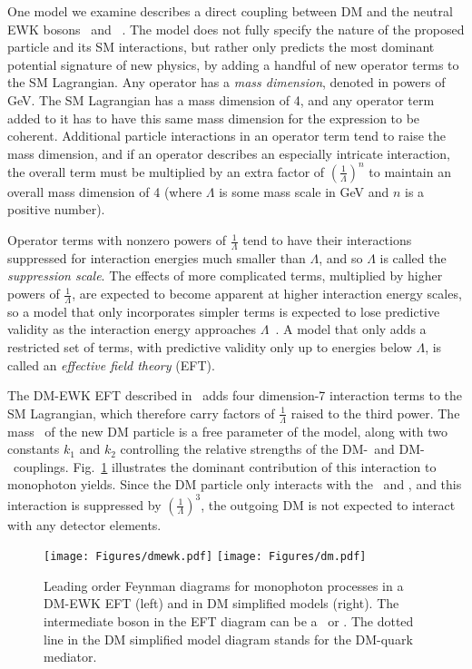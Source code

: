 One model we examine describes a direct coupling between DM and the neutral EWK bosons \PZ\ and \Pgamma~\cite{ref:PhysRevD.89.056011}. The model does not fully specify
the nature of the proposed particle and its SM interactions, but rather only predicts the most dominant potential signature of new physics,
by adding a handful of new operator terms to the SM Lagrangian. Any operator has a \textit{mass dimension}, denoted in powers of GeV. The SM Lagrangian has
a mass dimension of 4, and any operator term added to it has to have this same mass dimension for the expression to be coherent.
Additional particle interactions in an operator term tend to raise the mass dimension, and if an operator describes an especially intricate interaction,
the overall term must be multiplied by an extra factor of $(\frac{1}{\Lambda})^{n}$ to maintain an overall mass dimension of 4 (where $\Lambda$ is some mass
scale in GeV and $n$ is a positive number).

Operator terms with nonzero powers of $\frac{1}{\Lambda}$ tend to have their interactions suppressed for interaction energies much
smaller than $\Lambda$, and so $\Lambda$ is called the \textit{suppression scale}. The effects of more complicated terms, multiplied by higher powers of $\frac{1}{\Lambda}$,
are expected to become apparent at higher interaction energy scales, so a model that only incorporates simpler terms is expected to
lose predictive validity as the interaction energy approaches $\Lambda$~\cite{ref:j.aop.2013.04.016}. A model that only adds a restricted set of terms,
with predictive validity only up to energies below $\Lambda$, is called an \textit{effective field theory} (EFT).

The DM-EWK EFT described in~\cite{ref:PhysRevD.89.056011} adds four dimension-7 interaction terms to the SM Lagrangian, which therefore carry factors of $\frac{1}{\Lambda}$
raised to the third power. The mass \mdm\ of the new DM particle is a free parameter of the model, along with two constants $k_1$ and $k_2$ controlling
the relative strengths of the DM-\PZ\ and DM-\Pgamma\ couplings.
Fig.~\ref{fig:dm_diagrams} illustrates the dominant contribution of this interaction to monophoton yields. Since the DM
particle only interacts with the \PZ\ and \Pgamma, and this interaction is suppressed by $(\frac{1}{\Lambda})^{3}$, the outgoing DM is not expected to interact
with any detector elements.

\begin{figure}[hbtp]
  \begin{center}
    \texttt{[image: Figures/dmewk.pdf]}
    \texttt{[image: Figures/dm.pdf]}
    \caption{
      Leading order Feynman diagrams for monophoton processes in a DM-EWK EFT (left) and in DM simplified models (right).
      The intermediate boson in the EFT diagram can be a \PZ\ or \Pgamma. The dotted line in the DM simplified model diagram
      stands for the DM-quark mediator.
    }
    \label{fig:dm_diagrams}
  \end{center}
\end{figure}

